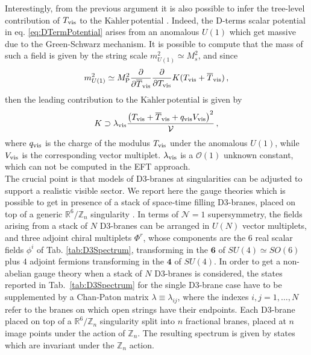 \documentclass[12pt,a4paper]{book}
\newcommand{\Kahler}{\ensuremath{\text{K}\ddot{\text{a}}\text{hler}\,}}
\newcommand{\V}{{\cal{V}}}
\begin{document}
Interestingly, from the previous argument it is also possible to infer the tree-level contribution of $T_{\rm vis}$ to the \Kahler potential \cite{Conlon:2008wa}. Indeed, the D-terms scalar potential in eq. \eqref{eq:DTermPotential} arises from an anomalous $U(1)$ which get massive due to the Green-Schwarz mechanism. It is possible to compute that the mass of such a field is given by the string scale $m_{U(1)}^2 \simeq M_s^2$, and since
\begin{align}
\label{eq:MassU1}
m_{U(1)}^2 \simeq M_{\rm P}^2 \frac{\partial}{\partial \overline{T}_{\rm vis}}\frac{\partial}{\partial T_{\rm vis}} K(T_{\rm vis} + \overline{T}_{\rm vis}) \,,
\end{align}
then the leading contribution to the \Kahler potential is given by
\begin{align}
K \supset \lambda_{\rm vis} \frac{\left(T_{\rm vis} + \overline{T}_{\rm vis} + q_{\rm vis} V_{\rm vis}\right)^2}{\V} \,,
\end{align}
where $q_{\rm vis}$ is the charge of the modulus $T_{\rm vis}$ under the anomalous $U(1)$, while $V_{\rm vis}$ is the corresponding vector multiplet. $\lambda_{\rm vis}$ is a $\mathcal{O}\left(1\right)$ unknown constant, which can not be computed in the EFT approach.\\

The crucial point is that models of D3-branes at singularities can be adjusted to support a realistic visible sector. We report here the gauge theories which is possible to get in presence of a stack of space-time filling D3-branes, placed on top of a generic $\mathbb{R}^6/\mathbb{Z}_n$ singularity \cite{Aldazabal:2000sa}. In terms of $\mathcal{N} = 1$ supersymmetry, the fields arising from a stack of $N$ D3-branes can be arranged in $U(N)$ vector multiplets, and three adjoint chiral multiplets $\Phi^r$, whose components are the $6$ real scalar fields $\phi^i$ of Tab. \ref{tab:D3Spectrum}, transforming in the $\mathbf{6}$ of $SU(4) \simeq SO(6)$ plus $4$ adjoint fermions transforming in the $\mathbf{4}$ of $SU(4)$. In order to get a non-abelian gauge theory when a stack of $N$ D3-branes is considered, the states reported in Tab.~\ref{tab:D3Spectrum} for the single D3-brane case have to be supplemented by a Chan-Paton matrix $\lambda \equiv \lambda_{ij}$, where the indexes $i, j = 1, \dots, N$ refer to the branes on which open strings have their endpoints. Each D3-brane placed on top of a $\mathbb{R}^6/\mathbb{Z}_n$ singularity split into $n$ fractional branes, placed at $n$ image points under the action of $\mathbb{Z}_n$. The resulting spectrum is given by states which are invariant under the $\mathbb{Z}_n$ action.\\
\end{document}
